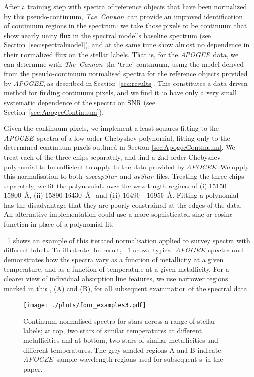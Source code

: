 \documentclass[12pt, preprint]{aastex}
\newcommand{\sectionname}{Section}
\newcommand{\figurenames}{\figurename s}
\newcommand{\tc}{\textsl{The~Cannon}}
\newcommand{\apogee}{\textsl{APOGEE}}
\newcommand{\aspcapstar}{\textsl{aspcapStar}}
\newcommand{\apstar}{\textsl{apStar}}
\begin{document}
After a training step with spectra of reference objects that have been  normalized  by this pseudo-continuum,
 \tc\ can provide an improved identification of continuum regions in the spectrum: 
we take those pixels to be continuum that show nearly unity flux in the spectral model's baseline spectrum (see \sectionname~\ref{sec:spectralmodel}), and at the same time show almost no dependence in their normalized flux on the stellar labels.
That is, for the \apogee\ data, we can determine with \tc\ the `true' continuum, using the model derived from the pseudo-continuum normalised spectra for the reference objects provided by \apogee, as described in \sectionname~\ref{sec:results}. This constitutes a data-driven method for finding continuum pixels, and we find it to have only a very small systematic dependence of the spectra on SNR (see \sectionname~\ref{sec:ApogeeContinuum}).

Given the continuum pixels, we implement a least-squares fitting to the \apogee\ spectra of a low-order Chebyshev polynomial, fitting only to the determined continuum pixels outlined in Section \ref{sec:ApogeeContinuum}. We treat each of the three chips separately, and find a 2nd-order Chebyshev polynomial to be sufficient to apply to the data provided by \apogee. We apply this normalisation to both \aspcapstar\ and \apstar\ files. Treating the three chips separately, we fit the polynomials over the wavelength regions of (i) 15150-15800~\AA, (ii) 15890 16430~\AA~ and (iii) 16490 - 16950~\AA. Fitting a polynomial has the disadvantage that they are poorly constrained at the edges of the data. An alternative implementation could use a more sophisticated sine or cosine function in place of a polynomial fit. 

\figurename~\ref{fig:norm} shows an example of this iterated normalisation applied to survey spectra with different labels. To illustrate the result, \figurename~\ref{fig:norm} shows typical \apogee\ spectra and demonstrates how the spectra 
vary as a function of metallicity at a given temperature, and as a function of temperature at a given metallicity. 
For a clearer view of individual absorption line features, we use narrower regions marked in this \figurename, (A) and (B), for all subsequent examination of the spectral data. 

\begin{figure}[h!]
  \texttt{[image: ./plots/four\_examples3.pdf]}
\caption{Continuum normalised spectra for stars across a range of stellar labels; at top, two stars of similar temperatures at different metallicities and at bottom, two stars of similar metallicities and different temperatures. The grey shaded regions A and B indicate \apogee\ sample wavelength regions used for subsequent \figurenames\ in the paper.}
\label{fig:norm}
\end{figure}
\end{document}
